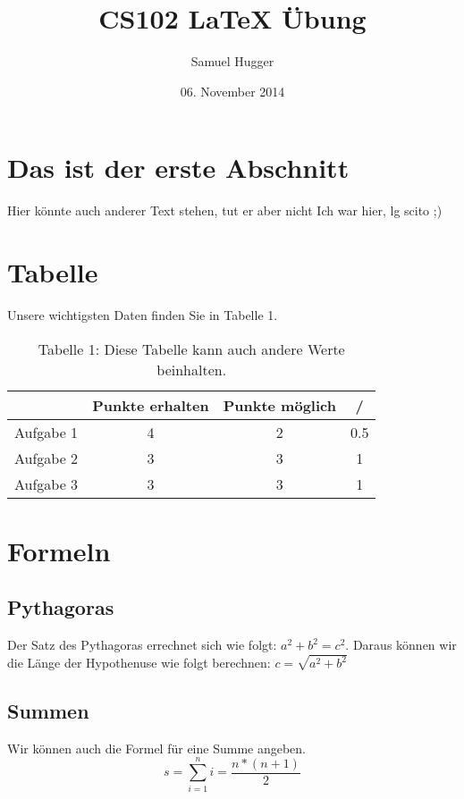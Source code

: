 \documentclass[11pt,a4paper]{article}
\title{CS102 LaTeX Übung}
\date{06. November 2014}
\author{Samuel Hugger}
\begin{document}
\maketitle
\section{Das ist der erste Abschnitt}

Hier könnte auch anderer Text stehen, tut er aber nicht
Ich war hier, lg scito ;)
\section{Tabelle}
Unsere wichtigsten Daten finden Sie in Tabelle 1.
\begin{table}[htbp]
\centering
\begin{tabular}{c|c|c|c}
& Punkte erhalten & Punkte möglich & / \\
\hline
Aufgabe 1 & 4 & 2 & 0.5 \\
Aufgabe 2 & 3 & 3 & 1 \\
Aufgabe 3 & 3 & 3 & 1 \\
\end{tabular}
\caption{Tabelle 1: Diese Tabelle kann auch andere Werte beinhalten.}
\end{table}
\section{Formeln}
\subsection{Pythagoras}

Der Satz des Pythagoras errechnet sich wie folgt: $a^2+b^2=c^2$. Daraus können wir die Länge der Hypothenuse wie folgt berechnen: $c = \sqrt{a^2 + b^2}$
\subsection{Summen}

Wir können auch die Formel für eine Summe angeben.
\begin{equation}
s=\sum\limits_{i=1}^{n}i=\frac{n*(n+1)}{2}
\end{equation}
\end{document}
